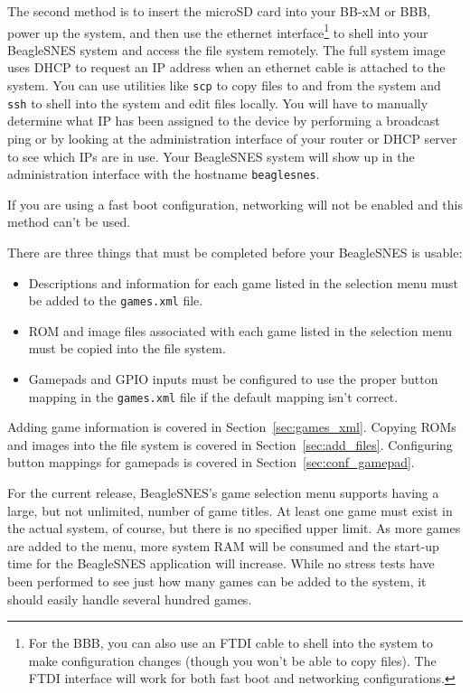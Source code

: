 The second method is to insert the microSD card into your BB-xM or BBB, power up the system, and then use the ethernet interface\footnote{For the BBB, you can also use an FTDI cable to shell into the system to make configuration changes (though you won't be able to copy files).  The FTDI interface will work for both fast boot and networking configurations.} to shell into your BeagleSNES system and access the file system remotely. The full system image uses DHCP to request an IP address when an ethernet cable is attached to the system. You can use utilities like \texttt{scp} to copy files to and from the system and \texttt{ssh} to shell into the system and edit files locally. You will have to manually determine what IP has been assigned to the device by performing a broadcast ping or by looking at the administration interface of your router or DHCP server to see which IPs are in use. Your BeagleSNES system will show up in the administration interface with the hostname \texttt{beaglesnes}. 

\begin{updateWarn}
If you are using a fast boot configuration, networking will not be enabled and this method can't be used.
\end{updateWarn}

There are three things that must be completed before your BeagleSNES is usable:

\begin{itemize}
\item Descriptions and information for each game listed in the selection menu must be added to the \texttt{games.xml} file. 
\item ROM and image files associated with each game listed in the selection menu must be copied into the file system.
\item Gamepads and GPIO inputs must be configured to use the proper button mapping in the \texttt{games.xml} file if the default mapping isn't correct.
\end{itemize}

Adding game information is covered in Section~\ref{sec:games_xml}.  Copying ROMs and images into the file system is covered in Section~\ref{sec:add_files}.  Configuring button mappings for gamepads is covered in Section~\ref{sec:conf_gamepad}.

For the current release, BeagleSNES's game selection menu supports having a large, but not unlimited, number of game titles. At least one game must exist in the actual system, of course, but there is no specified upper limit.  As more games are added to the menu, more system RAM will be consumed and the start-up time for the BeagleSNES application will increase.  While no stress tests have been performed to see just how many games can be added to the system, it should easily handle several hundred games.

